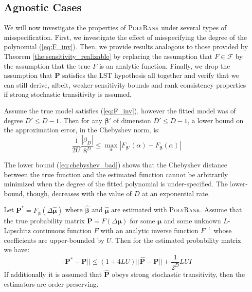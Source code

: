 \documentclass[twoside,11pt]{article}
\begin{document}
\subsection{Agnostic Cases}
We will now  investigate the properties of \textsc{PolyRank} under several types of misspecification. First, we investigate the effect of misspecifying the degree of the polynomial (\ref{eq:F_inv}). Then, we provide results analogous to those provided by Theorem \ref{the:sensitivity_realizable} by replacing the assumption that $F\in \mathcal{F}$ by the assumption that the true $F$ is an analytic function.  Finally, we drop the assumption that $\boldsymbol{P}$ satisfies the LST hypothesis all together and verify that we can still derive, albeit, weaker sensitivity bounds and rank consistency properties if strong stochastic transitivity is assumed.

\begin{theorem}%
\label{the:underfit}
Assume the true model satisfies (\ref{eq:F_inv}), however the fitted model was of degree $D' \leq D-1$. Then for any $\boldsymbol{\beta'}$ of dimension $D' \leq D-1$, a lower bound on the approximation error, in the Chebyshev norm, is:
\begin{equation}
\label{eq:chebyshev_bad}
    \frac{1}{2 U} \frac{|\beta_{D}|}{8^D} \leq \max_{\alpha }|F_{\boldsymbol{\beta'}}(\alpha) - F_{\boldsymbol{\beta}}(\alpha)|  
\end{equation}
\end{theorem}

The lower bound (\ref{eq:chebyshev_bad}) shows that the Chebyshev distance between the true function and the estimated function cannot be arbitrarily minimized when the degree of the fitted polynomial is under-specified. The lower-bound, though, decreases with the value of $D$ at an exponential rate.

\begin{theorem}%
\label{the:analytic_sensitivity_LS}
Let $\boldsymbol{P^*} = F_{\boldsymbol{\hat{\beta}}}\left(\Delta \boldsymbol{\hat{\mu}}\right)$ where $\boldsymbol{\hat{\beta}}$ and $\boldsymbol{\hat{\mu}}$ are estimated with \textsc{PolyRank}. Assume that the true probability matrix $\boldsymbol{P} = F(\Delta \boldsymbol{\mu})$ for some $\boldsymbol{\mu}$ and some unknown $L$-Lipschitz continuous function $F$ with an analytic inverse function $F^{-1}$ whose coefficients are upper-bounded by $U$. Then for the estimated probability matrix we have:
\begin{equation}
\label{eq:analytic_sensitivity}
||\boldsymbol{P^*} - \boldsymbol{P}||\leq (1+4LU)||\boldsymbol{\hat{P}} - \boldsymbol{P}||  + \frac{1}{2^D}LUI 
\end{equation}
If additionally it is assumed that $\boldsymbol{\hat P}$ obeys strong stochastic transitivity, then the estimators are order preserving.
\end{theorem}
\end{document}
